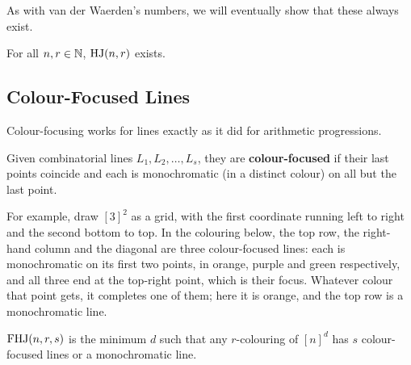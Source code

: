 As with van der Waerden's numbers, we will eventually show that these always exist.

\begin{boxtheorem} \label{Ch6:Thm:Hales_Jewett}
    For all $n, r \in \mathbb{N}$, $\operatorname{HJ}(n, r)$ exists.
\end{boxtheorem}

\subsection{Colour-Focused Lines}

Colour-focusing works for lines exactly as it did for arithmetic progressions.

\begin{boxdefinition}
    Given combinatorial lines $L_1, L_2, \ldots, L_s$, they are \textbf{colour-focused} if their last points coincide and each is monochromatic (in a distinct colour) on all but the last point.
\end{boxdefinition}

For example, draw $[3]^2$ as a grid, with the first coordinate running left to right and the second bottom to top. In the colouring below, the top row, the right-hand column and the diagonal are three colour-focused lines: each is monochromatic on its first two points, in orange, purple and green respectively, and all three end at the top-right point, which is their focus. Whatever colour that point gets, it completes one of them; here it is orange, and the top row is a monochromatic line.

\begin{figure}[H]
    \centering
\end{figure}

\begin{boxdefinition}
    $\operatorname{FHJ}(n, r, s)$ is the minimum $d$ such that any $r$-colouring of $[n]^d$ has $s$ colour-focused lines or a monochromatic line.
\end{boxdefinition}

